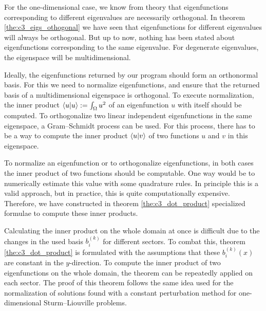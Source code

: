 For the one-dimensional case, we know from theory that eigenfunctions corresponding to different eigenvalues are necessarily orthogonal. In theorem \ref{the:c3_eigs_othogonal} we have seen that eigenfunctions for different eigenvalues will always be orthogonal. But up to now, nothing has been stated about eigenfunctions corresponding to the same eigenvalue. For degenerate eigenvalues, the eigenspace will be multidimensional.

Ideally, the eigenfunctions returned by our program should form an orthonormal basis. For this we need to normalize eigenfunctions, and ensure that the returned basis of a multidimensional eigenspace is orthogonal. To execute normalization, the inner product $\bra{u}\ket{u} := \int_\Omega u^2$  of an eigenfunction $u$ with itself should be computed. To orthogonalize two linear independent eigenfunctions in the same eigenspace, a Gram--Schmidt process can be used. For this process, there has to be a way to compute the inner product $\bra{u}\ket{v}$ of two functions $u$ and $v$ in this eigenspace.

To normalize an eigenfunction or to orthogonalize eigenfunctions, in both cases the inner product of two functions should be computable. One way would be to numerically estimate this value with some quadrature rules. In principle this is a valid approach, but in practice, this is quite computationally expensive. Therefore, we have constructed in theorem \ref{the:c3_dot_product} specialized formulae to compute these inner products.

Calculating the inner product on the whole domain at once is difficult due to the changes in the used basis $b_i^{(k)}$ for different sectors. To combat this, theorem \ref{the:c3_dot_product} is formulated with the assumptions that these $b_i^{(k)}(x)$ are constant in the $y$-direction. To compute the inner product of two eigenfunctions on the whole domain, the theorem can be repeatedly applied on each sector. The proof of this theorem follows the same idea used for the normalization of solutions found with a constant perturbation method for one-dimensional Sturm--Liouville problems.

